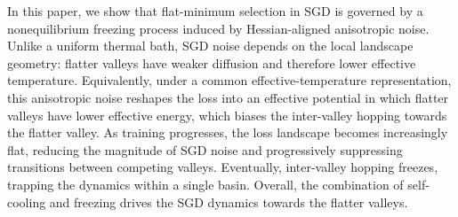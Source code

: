 \documentclass[aps,prx,reprint,superscriptaddress,longbibliography,nofootinbib,floatfix]{revtex4-2}
\begin{document}

In this paper, we show that flat-minimum selection in SGD is governed by a nonequilibrium freezing process induced by Hessian-aligned anisotropic noise. Unlike a uniform thermal bath, SGD noise depends on the local landscape geometry: flatter valleys have weaker diffusion and therefore lower effective temperature. Equivalently, under a common effective-temperature representation, this anisotropic noise reshapes the loss into an effective potential in which flatter valleys have lower effective energy, which biases the inter-valley hopping towards the flatter valley. %
As training progresses, the loss landscape becomes increasingly flat, reducing the magnitude of SGD noise and progressively suppressing transitions between competing valleys. Eventually, inter-valley hopping freezes, trapping the dynamics within a single basin. Overall, the combination of self-cooling and freezing drives the SGD dynamics towards the flatter valleys. 

\end{document}
